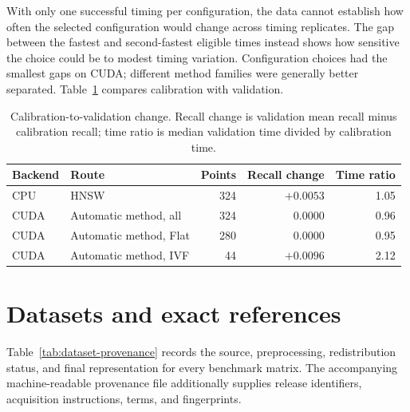 \documentclass[11pt]{article}
\begin{document}
With only one successful timing per configuration, the data cannot establish
how often the selected configuration would change across timing replicates.
The gap between the fastest and second-fastest eligible times instead shows
how sensitive the choice could be to modest timing variation.
Configuration choices had the smallest gaps on CUDA; different method
families were generally better separated.
Table~\ref{tab:calibration-validation} compares calibration with validation.

\begin{table}[h]
\centering

\begin{tabular}{@{}llrrr@{}}
\toprule
Backend & Route & Points & Recall change & Time ratio \\
\midrule
CPU & HNSW & 324 & $+0.0053$ & 1.05 \\
CUDA & Automatic method, all & 324 & $0.0000$ & 0.96 \\
CUDA & Automatic method, Flat & 280 & $0.0000$ & 0.95 \\
CUDA & Automatic method, IVF & 44 & $+0.0096$ & 2.12 \\
\bottomrule
\end{tabular}
\caption{Calibration-to-validation change. Recall change is validation mean
recall minus calibration recall; time ratio is median validation time divided by
calibration time.}
\label{tab:calibration-validation}
\end{table}

\section{Datasets and exact references}

Table~\ref{tab:dataset-provenance} records the source, preprocessing,
redistribution status, and final representation for every benchmark matrix.
The accompanying machine-readable provenance file additionally supplies
release identifiers, acquisition instructions, terms, and fingerprints.
\end{document}
